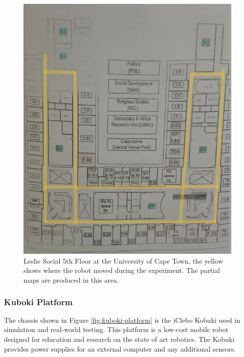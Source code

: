 \begin{figure}[H]
    \centering
    \includegraphics[width=1\textwidth]{figs/real_world_results/original_floor.png}
    \caption{Leslie Social 5th Floor at the University of Cape Town, the yellow shows where the robot moved during the experiment. The partial maps are produced in this area. }
    \label{fig:uct_floor}
\end{figure}


\subsubsection{Kuboki Platform}

The chassis shown in Figure \ref{fig:kuboki-platform} is the iClebo Kobuki used in simulation and real-world testing. This platform is a low-cost mobile robot designed for education and research on the state of art robotics. The Kobuki provides power supplies for an external computer and any additional sensors.

